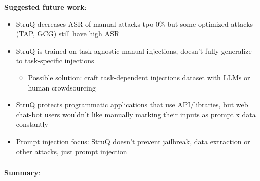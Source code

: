 \documentclass[
  letterpaper,
  DIV=11,
  numbers=noendperiod]{scrartcl}
\providecommand{\tightlist}{%
  \setlength{\itemsep}{0pt}\setlength{\parskip}{0pt}}
\begin{document}
\textbf{Suggested future work}:

\begin{itemize}
\tightlist
\item
  StruQ decreases ASR of manual attacks tpo 0\% but some optimized
  attacks (TAP, GCG) still have high ASR
\item
  StruQ is trained on task-agnostic manual injections, doesn't fully
  generalize to task-specific injections

  \begin{itemize}
  \tightlist
  \item
    Possible solution: craft task-dependent injections dataset with LLMs
    or human crowdsourcing
  \end{itemize}
\item
  StruQ protects programmatic applications that use API/libraries, but
  web chat-bot users wouldn't like manually marking their inputs as
  prompt x data constantly
\item
  Prompt injection focus: StruQ doesn't prevent jailbreak, data
  extraction or other attacks, just prompt injection
\end{itemize}

\subsubsection{\texorpdfstring{\autocite{GongLZRCC0L25_Papillon}}{{[}@GongLZRCC0L25\_Papillon{]}}}\label{gonglzrcc0l25_papillon}

\textbf{Summary}:
\end{document}
